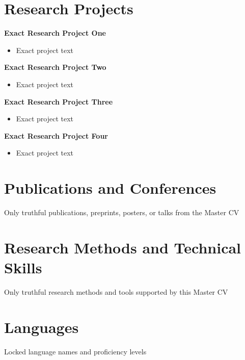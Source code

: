 \documentclass[a4paper,10pt]{article}
\begin{document}
\section*{Research Projects}
\textbf{Exact Research Project One}\\
\begin{itemize}[leftmargin=1.5em, noitemsep]\item Exact project text\end{itemize}
\vspace{0.35em}
\textbf{Exact Research Project Two}\\
\begin{itemize}[leftmargin=1.5em, noitemsep]\item Exact project text\end{itemize}
\vspace{0.35em}
\textbf{Exact Research Project Three}\\
\begin{itemize}[leftmargin=1.5em, noitemsep]\item Exact project text\end{itemize}
\vspace{0.35em}
\textbf{Exact Research Project Four}\\
\begin{itemize}[leftmargin=1.5em, noitemsep]\item Exact project text\end{itemize}

\section*{Publications and Conferences}
Only truthful publications, preprints, posters, or talks from the Master CV

\section*{Research Methods and Technical Skills}
Only truthful research methods and tools supported by this Master CV

\section*{Languages}
Locked language names and proficiency levels
\end{document}

